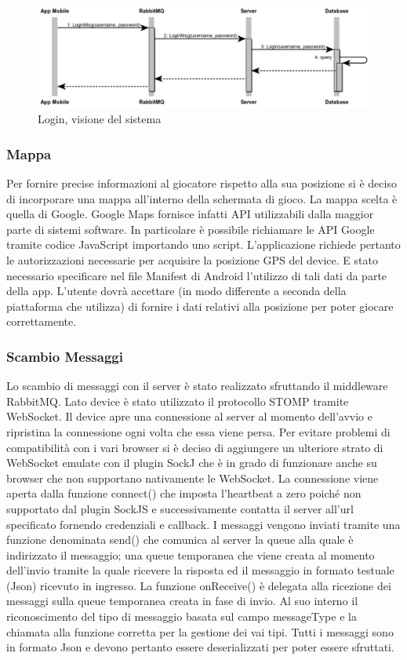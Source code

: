 \documentclass[12pt, italian]{article}
\begin{document}
\begin{figure}[H]
	\centering
	\includegraphics[width=1\textwidth]{img/diagram03.png}
	\caption{Login, visione del sistema}
\end{figure}

\subsubsection*{Mappa}
Per fornire precise informazioni al giocatore rispetto alla sua posizione si è deciso di incorporare una mappa all'interno della schermata di gioco.
La mappa scelta è quella di Google. Google Maps fornisce infatti API utilizzabili dalla maggior parte di sistemi software. In particolare è possibile richiamare le API Google tramite codice JavaScript importando uno script.
L'applicazione richiede pertanto le autorizzazioni necessarie per acquisire la posizione GPS del device. E stato necessario specificare nel file Manifest di Android l'utilizzo di tali dati da parte della app. L'utente dovrà accettare (in modo differente a seconda della piattaforma che utilizza) di fornire i dati relativi alla posizione per poter giocare correttamente.

\subsubsection*{Scambio Messaggi}
Lo scambio di messaggi con il server è stato realizzato sfruttando il middleware RabbitMQ.
Lato device è stato utilizzato il protocollo STOMP tramite WebSocket.
Il device apre una connessione al server al momento dell'avvio e ripristina la connessione ogni volta che essa viene persa.
Per evitare problemi di compatibilità con i vari browser si è deciso di aggiungere un ulteriore strato di WebSocket emulate con il plugin SockJ che è in grado di funzionare anche su browser che non supportano nativamente le WebSocket.
La connessione viene aperta dalla funzione connect() che imposta l'heartbeat a zero poiché non supportato dal plugin SockJS e successivamente contatta il server all'url specificato fornendo credenziali e callback.
I messaggi vengono inviati tramite una funzione denominata send() che comunica al server la queue alla quale è indirizzato il messaggio; una queue temporanea che viene creata al momento dell'invio tramite la quale ricevere la risposta ed il messaggio in formato testuale (Json) ricevuto in ingresso.
La funzione onReceive() è delegata alla ricezione dei messaggi sulla queue temporanea creata in fase di invio. Al suo interno il riconoscimento del tipo di messaggio basata sul campo messageType e la chiamata alla funzione corretta per la gestione dei vai tipi.
Tutti i messaggi sono in formato Json e devono pertanto essere deserializzati per poter essere sfruttati.
\end{document}
